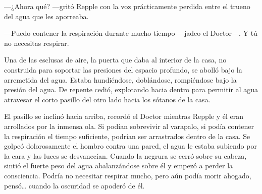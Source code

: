 {---¿Ahora qué? ---gritó Repple con la voz prácticamente perdida entre
el trueno del agua que les aporreaba.}

{---Puedo contener la respiración durante mucho tiempo ---jadeo el
Doctor---. Y tú no necesitas respirar.}

{Una de las esclusas de aire, la puerta que daba al interior de la casa,
	no construida para soportar las presiones del espacio profundo, se
	abolló bajo la arremetida del agua. Estaba hundiéndose, doblándose,
	rompiéndose bajo la presión del agua. De repente cedió, explotando hacia
	dentro para permitir al agua atravesar el corto pasillo del otro lado
hacia los sótanos de la casa.}

{El pasillo se inclinó hacia arriba, recordó el Doctor mientras Repple y
	él eran arrollados por la inmensa ola. Si podían sobrevivir al varapalo,
	si podía contener la respiración el tiempo suficiente, podrían ser
	arrastrados dentro de la casa. Se golpeó dolorosamente el hombro contra
	una pared, el agua le estaba subiendo por la cara y las luces se
	desvanecían. Cuando la negrura se cerró sobre su cabeza, sintió el
	fuerte peso del agua abalanzándose sobre él y empezó a perder la
	consciencia. Podría no necesitar respirar mucho, pero aún podía morir
	ahogado, pensó\ldots{} cuando la oscuridad se apoderó de él.}
